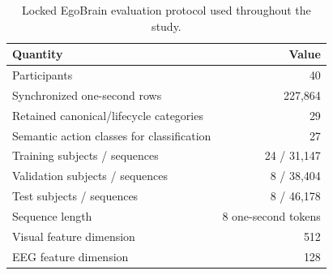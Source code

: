 
\begin{table}[t]
\centering
\caption{Locked EgoBrain evaluation protocol used throughout the study.}
\label{tab:dataset}
\begin{tabular}{lr}
\toprule
Quantity & Value\\
\midrule
Participants & 40\\
Synchronized one-second rows & 227,864\\
Retained canonical/lifecycle categories & 29\\
Semantic action classes for classification & 27\\
Training subjects / sequences & 24 / 31,147\\
Validation subjects / sequences & 8 / 38,404\\
Test subjects / sequences & 8 / 46,178\\
Sequence length & 8 one-second tokens\\
Visual feature dimension & 512\\
EEG feature dimension & 128\\
\bottomrule
\end{tabular}
\end{table}

